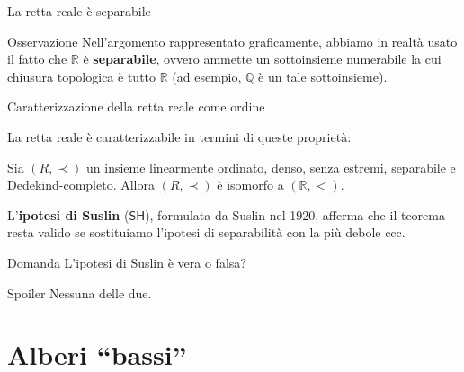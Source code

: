 \documentclass{beamer}
\theoremstyle{num.custom-title}
\theoremstyle{custom-title}
\DeclareMathOperator{\down}{\downarrow}
\newcommand{\SH}{\ensuremath{\mathsf{SH}}\xspace}
\newcommand{\Q}{\mathbb{Q}}
\newcommand{\R}{\mathbb{R}}
\newcommand*{\defeq}{\mathrel{\rlap{%
                     \raisebox{0.3ex}{$\cdot$}}%
                     \raisebox{-0.3ex}{$\cdot$}}%
                     =}
\renewcommand{\emph}[1]{\textbf{#1}}
\begin{document}
\begin{frame}{La retta reale è separabile}

\begin{alertblock}{Osservazione}
Nell'argomento rappresentato graficamente, abbiamo in realtà usato il fatto che $\R$ è \emph{separabile}, ovvero ammette un sottoinsieme numerabile la cui chiusura topologica è tutto $\R$ (ad esempio, $\Q$ è un tale sottoinsieme).
\end{alertblock}

\end{frame}


\begin{frame}{Caratterizzazione della retta reale come ordine}

La retta reale è caratterizzabile in termini di queste proprietà:

\begin{theorem}[Cantor, 1895]
Sia $(R,\prec)$ un insieme linearmente ordinato, denso, senza estremi, separabile e Dedekind-completo. Allora $(R,\prec)$ è isomorfo a $(\R,<)$.
\end{theorem}

\pause

L'\emph{ipotesi di Suslin} (\SH), formulata da Suslin nel 1920, afferma che il teorema resta valido se sostituiamo l'ipotesi di separabilità con la più debole ccc.

\pause

\begin{exampleblock}{Domanda}
L'ipotesi di Suslin è vera o falsa?
\end{exampleblock}

\pause 

\begin{alertblock}{Spoiler}
Nessuna delle due.
\end{alertblock}

\end{frame}


\section{Alberi ``bassi''}

%
%
\end{document}
